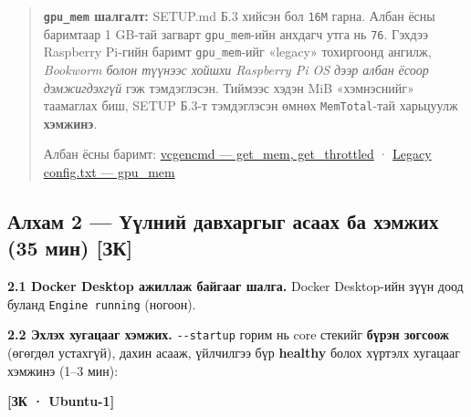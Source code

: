 \begin{quote}
\textbf{\texttt{gpu\_mem} шалгалт:} SETUP.md Б.3 хийсэн бол \texttt{16M} гарна. Албан ёсны баримтаар 1 GB-тай загварт \texttt{gpu\_mem}-ийн анхдагч утга нь \texttt{76}. Гэхдээ Raspberry Pi-гийн баримт \texttt{gpu\_mem}-ийг «legacy» тохиргоонд ангилж, \emph{Bookworm болон түүнээс хойшхи Raspberry Pi OS дээр албан ёсоор дэмжигдэхгүй} гэж тэмдэглэсэн. Тиймээс хэдэн MiB «хэмнэснийг» таамаглах биш, SETUP Б.3-т тэмдэглэсэн өмнөх \texttt{MemTotal}-тай харьцуулж \textbf{хэмжинэ}.

Албан ёсны баримт: \href{https://www.raspberrypi.com/documentation/computers/os.html\#vcgencmd}{vcgencmd --- get\_\allowbreak{}mem, get\_\allowbreak{}throttled} · \href{https://www.raspberrypi.com/documentation/computers/legacy_config_txt.html\#gpu_mem}{Legacy config.\allowbreak{}txt --- gpu\_\allowbreak{}mem}
\end{quote}

\hypertarget{ux430ux43bux445ux430ux43c-2-ux4afux4afux43bux43dux438ux439-ux434ux430ux432ux445ux430ux440ux433ux44bux433-ux430ux441ux430ux430ux445-ux431ux430-ux445ux44dux43cux436ux438ux445-35-ux43cux438ux43d-ux437ux43a}{%
\subsection{Алхам 2 --- Үүлний давхаргыг асаах ба хэмжих (35 мин) {[}ЗК{]}}\label{ux430ux43bux445ux430ux43c-2-ux4afux4afux43bux43dux438ux439-ux434ux430ux432ux445ux430ux440ux433ux44bux433-ux430ux441ux430ux430ux445-ux431ux430-ux445ux44dux43cux436ux438ux445-35-ux43cux438ux43d-ux437ux43a}}

\textbf{2.1 Docker Desktop ажиллаж байгааг шалга.} Docker Desktop-ийн зүүн доод буланд \texttt{Engine\ running} (ногоон).

\textbf{2.2 Эхлэх хугацааг хэмжих.} \texttt{-\/-startup} горим нь core стекийг \textbf{бүрэн зогсоож} (өгөгдөл устахгүй), дахин асааж, үйлчилгээ бүр \textbf{healthy} болох хүртэлх хугацааг хэмжинэ (1--3 мин):

\textbf{{[}ЗК · Ubuntu-1{]}}

\begin{Shaded}
\begin{Highlighting}[]
\KeywordTok{|} 
\end{Highlighting}
\end{Shaded}

